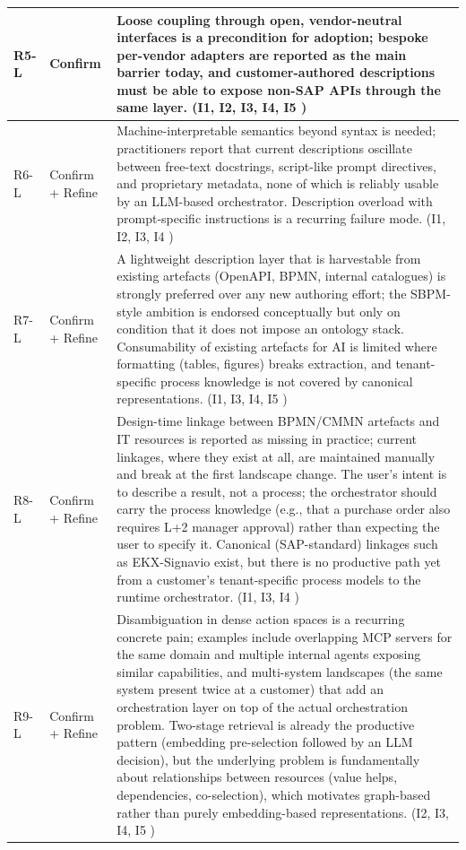 \begin{longtable}{@{} p{1.4cm} p{3.0cm} p{\dimexpr\textwidth-4.8cm\relax} @{}}
\midrule
R5-L  & Confirm & Loose coupling through open, vendor-neutral interfaces is a precondition for adoption; bespoke per-vendor adapters are reported as the main barrier today, and customer-authored descriptions must be able to expose non-SAP APIs through the same layer. (I1, I2, I3, I4, I5 ) \\
\midrule
R6-L  & Confirm + Refine & Machine-interpretable semantics beyond syntax is needed; practitioners report that current descriptions oscillate between free-text docstrings, script-like prompt directives, and proprietary metadata, none of which is reliably usable by an LLM-based orchestrator. Description overload with prompt-specific instructions is a recurring failure mode. (I1, I2, I3, I4 ) \\
\midrule
R7-L  & Confirm + Refine & A lightweight description layer that is harvestable from existing artefacts (OpenAPI, BPMN, internal catalogues) is strongly preferred over any new authoring effort; the SBPM-style ambition is endorsed conceptually but only on condition that it does not impose an ontology stack. Consumability of existing artefacts for AI is limited where formatting (tables, figures) breaks extraction, and tenant-specific process knowledge is not covered by canonical representations. (I1, I3, I4, I5 ) \\
\midrule
R8-L  & Confirm + Refine & Design-time linkage between BPMN/CMMN artefacts and IT resources is reported as missing in practice; current linkages, where they exist at all, are maintained manually and break at the first landscape change. The user's intent is to describe a result, not a process; the orchestrator should carry the process knowledge (e.g., that a purchase order also requires L+2 manager approval) rather than expecting the user to specify it. Canonical (SAP-standard) linkages such as EKX-Signavio exist, but there is no productive path yet from a customer's tenant-specific process models to the runtime orchestrator. (I1, I3, I4 ) \\
\midrule
R9-L  & Confirm + Refine & Disambiguation in dense action spaces is a recurring concrete pain; examples include overlapping MCP servers for the same domain and multiple internal agents exposing similar capabilities, and multi-system landscapes (the same system present twice at a customer) that add an orchestration layer on top of the actual orchestration problem. Two-stage retrieval is already the productive pattern (embedding pre-selection followed by an LLM decision), but the underlying problem is fundamentally about relationships between resources (value helps, dependencies, co-selection), which motivates graph-based rather than purely embedding-based representations. (I2, I3, I4, I5 ) \\

\end{longtable}
